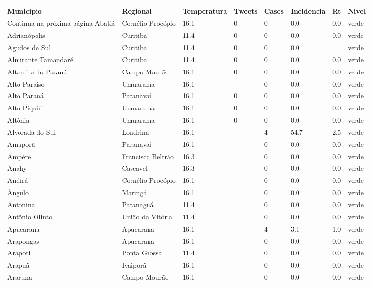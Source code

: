 \begin{longtable}{l|lllllll}
  \hline
Municipio & Regional & Temperatura & Tweets & Casos & Incidencia & Rt & Nivel \\ 
  \hline
\endhead
\hline
{\footnotesize Continua na próxima página}
\endfoot
\endlastfoot
Abatiá & Cornélio Procópio & 16.1 & 0 & 0 & 0.0 & 0.0 & verde \\ 
  Adrianópolis & Curitiba & 11.4 & 0 & 0 & 0.0 & 0.0 & verde \\ 
  Agudos do Sul & Curitiba & 11.4 & 0 & 0 & 0.0 &  & verde \\ 
  Almirante Tamandaré & Curitiba & 11.4 & 0 & 0 & 0.0 & 0.0 & verde \\ 
  Altamira do Paraná & Campo Mourão & 16.1 & 0 & 0 & 0.0 & 0.0 & verde \\ 
  Alto Paraíso & Umuarama & 16.1 &  & 0 & 0.0 & 0.0 & verde \\ 
  Alto Paraná & Paranavaí & 16.1 & 0 & 0 & 0.0 & 0.0 & verde \\ 
  Alto Piquiri & Umuarama & 16.1 & 0 & 0 & 0.0 & 0.0 & verde \\ 
  Altônia & Umuarama & 16.1 & 0 & 0 & 0.0 & 0.0 & verde \\ 
  Alvorada do Sul & Londrina & 16.1 &  & 4 & 54.7 & 2.5 & verde \\ 
  Amaporã & Paranavaí & 16.1 &  & 0 & 0.0 & 0.0 & verde \\ 
  Ampére & Francisco Beltrão & 16.3 &  & 0 & 0.0 & 0.0 & verde \\ 
  Anahy & Cascavel & 16.3 &  & 0 & 0.0 & 0.0 & verde \\ 
  Andirá & Cornélio Procópio & 16.1 &  & 0 & 0.0 & 0.0 & verde \\ 
  Ângulo & Maringá & 16.1 &  & 0 & 0.0 & 0.0 & verde \\ 
  Antonina & Paranaguá & 11.4 &  & 0 & 0.0 & 0.0 & verde \\ 
  Antônio Olinto & União da Vitória & 11.4 &  & 0 & 0.0 & 0.0 & verde \\ 
  Apucarana & Apucarana & 16.1 &  & 4 & 3.1 & 1.0 & verde \\ 
  Arapongas & Apucarana & 16.1 &  & 0 & 0.0 & 0.0 & verde \\ 
  Arapoti & Ponta Grossa & 11.4 &  & 0 & 0.0 & 0.0 & verde \\ 
  Arapuã & Ivaiporã & 16.1 &  & 0 & 0.0 & 0.0 & verde \\ 
  Araruna & Campo Mourão & 16.1 &  & 0 & 0.0 & 0.0 & verde \\ 

\end{longtable}
